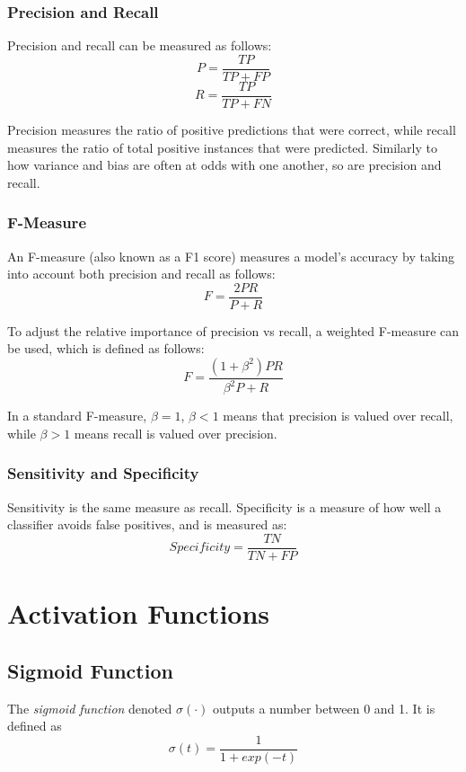 \documentclass[12pt]{article}
\begin{document}
        \subsubsection{Precision and Recall}
            Precision and recall can be measured as follows:
            $$P = \frac{TP}{TP + FP}$$
            $$R = \frac{TP}{TP + FN}$$
    
            Precision measures the ratio of positive predictions that were correct, while recall measures the ratio of
            total positive instances that were predicted. Similarly to how variance and bias are often at odds with one
            another, so are precision and recall.
    
        \subsubsection{F-Measure}
            An F-measure (also known as a F1 score) measures a model's accuracy by taking into account both precision
            and recall as follows:
            $$F = \frac{2PR}{P + R}$$
    
            To adjust the relative importance of precision vs recall, a weighted F-measure can be used, which is defined
            as follows:
            $$F = \frac{(1 + \beta^2)PR}{\beta^2 P + R}$$
    
            In a standard F-measure, $\beta = 1$, $\beta < 1$ means that precision is valued over recall, while $\beta >
            1$ means recall is valued over precision.
    
        \subsubsection{Sensitivity and Specificity}
            Sensitivity is the same measure as recall. Specificity is a measure of how well a classifier avoids false
            positives, and is measured as:
            $$Specificity = \frac{TN}{TN + FP}$$

\section{Activation Functions}
    \subsection{Sigmoid Function} \label{sec:Sigmoid}
        The \textit{sigmoid function} denoted $\sigma(\cdot)$ outputs a number between 0 and 1. It is defined as
        $$ \sigma(t) = \frac{1}{1 + exp(-t)} $$
\end{document}
